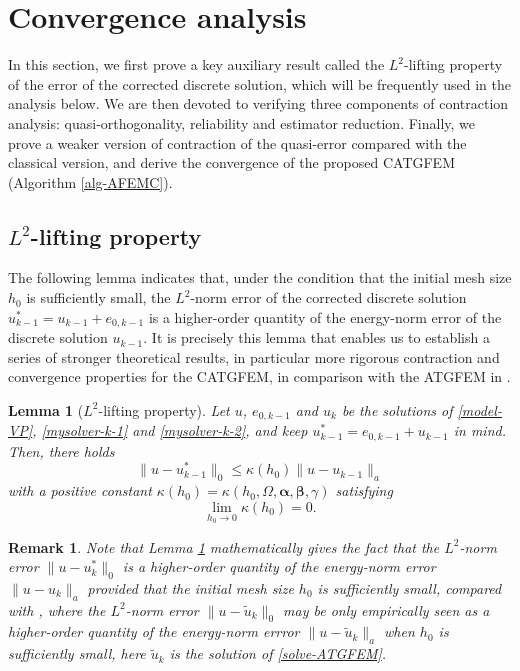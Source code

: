 \documentclass[preprint,times]{elsarticle}%
\newtheorem{lemma}{Lemma}[section]
\newtheorem{remark}{Remark}[section]
\numberwithin{algorithm}{section}
\numberwithin{equation}{section}
\newcommand{\anorm}[1]{\|#1\|_a}
\newcommand{\valpha}{\boldsymbol{\alpha}}
\newcommand{\vbeta}{\boldsymbol{\beta}}
\newcommand{\tu}{\tilde{u}}
\newcommand{\Ltw}[1]{\|#1\|_0}
\def\leq{\leqslant}
\begin{document}
\section{Convergence analysis}\label{sect3}

In this section, we first prove a key auxiliary result called the $L^2$-lifting property of the error of the corrected discrete solution, which will be frequently used in the analysis below. We are then devoted to verifying three components of contraction analysis: quasi-orthogonality, reliability and estimator reduction. Finally, we prove a weaker version of contraction of the quasi-error compared with the classical version, and derive the convergence of the proposed CATGFEM (Algorithm \ref{alg-AFEMC}). 

\subsection{$L^2$-lifting property} 
The following lemma indicates that, under the condition that the initial mesh size $h_0$ is sufficiently small, the $L^2$-norm error of the corrected discrete solution $u_{k-1}^* = u_{k-1} + e_{0,k-1}$ is a higher-order quantity of the energy-norm error of the discrete solution $u_{k-1}$. It is precisely this lemma that enables us to establish a series of stronger theoretical results, in particular more rigorous contraction and convergence properties for the CATGFEM, in comparison with the ATGFEM in \cite{LiYkZhangY21:A908}.

\begin{lemma}[$L^2$-lifting property]\label{lem-L2-lifting}
	Let $u$, $e_{0,k-1}$ and $u_k$ be the solutions of \eqref{model-VP}, \eqref{mysolver-k-1} and \eqref{mysolver-k-2}, and keep $u_{k-1}^*=e_{0,k-1} + u_{k-1}$ in mind. Then, there holds 
		\begin{equation}\label{result-L2-lifting}
			\Ltw{u-u_{k-1}^*} \leq \kappa(h_0) \anorm{u-u_{k-1}}
		\end{equation}
with a positive constant $\kappa(h_0) = \kappa(h_0,\Omega,\valpha,\vbeta,\gamma)$ satisfying
		\begin{equation}\label{property-kappaH}
			\lim_{h_0 \rightarrow 0} \kappa(h_0) = 0.  
		\end{equation}
\end{lemma}

\begin{remark}Note that Lemma \ref{lem-L2-lifting} mathematically gives the fact that the $L^2$-norm error $\|u-u_{k}^*\|_0$ is a higher-order quantity of the energy-norm error $\anorm{u-u_{k}}$ provided that the initial mesh size $h_0$ is sufficiently small, compared with \cite{LiYkZhangY21:A908}, where the $L^2$-norm error $\|u-\tu_k\|_0$ may be only empirically seen as a higher-order quantity of the energy-norm errror $\anorm{u-\tu_k}$ when $h_0$ is sufficiently small, here $\tu_k$ is the solution of \eqref{solve-ATGFEM}. 
\end{remark}
\end{document}
